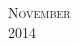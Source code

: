 \documentclass[landscape]{article}
\begin{document}
\newpage

\begin{center}
\textsc{\LARGE November}\\ %
\textsc{\large 2014} %
\end{center}

\begin{calendar}{\hsize}
 




\BlankDay
\BlankDay
\BlankDay
\BlankDay
\BlankDay
\BlankDay





\end{calendar}
\end{document}
